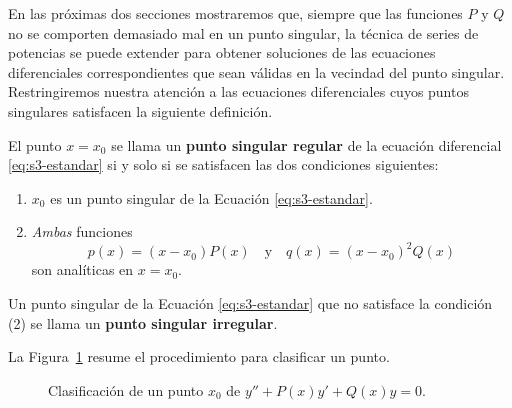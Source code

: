 En las próximas dos secciones mostraremos que, siempre que las funciones $P$ y $Q$ no se comporten demasiado mal en un punto singular, la técnica de series de potencias se puede extender para obtener soluciones de las ecuaciones diferenciales correspondientes que sean válidas en la vecindad del punto singular. Restringiremos nuestra atención a las ecuaciones diferenciales cuyos puntos singulares satisfacen la siguiente definición.
 
\begin{definition}
    El punto $x = x_0$ se llama un \textbf{punto singular regular} de la ecuación diferencial \eqref{eq:s3-estandar} si y solo si se satisfacen las dos condiciones siguientes:
\begin{enumerate}
    \item $x_0$ es un punto singular de la Ecuación \eqref{eq:s3-estandar}.
    \item \textit{Ambas} funciones
    \[ p(x) = (x - x_0)P(x) \quad \text{y} \quad q(x) = (x - x_0)^2Q(x) \]
    son analíticas en $x = x_0$.
\end{enumerate}
Un punto singular de la Ecuación \eqref{eq:s3-estandar} que no satisface la condición (2) se llama un \textbf{punto singular irregular}.
\end{definition}
 
La Figura~\ref{fig:s3-clasificacion} resume el procedimiento para clasificar un punto.
 
\begin{figure}[H]
\centering
{}
\caption{Clasificación de un punto $x_0$ de $y''+P(x)y'+Q(x)y=0$.}
\label{fig:s3-clasificacion}
\end{figure}
 
